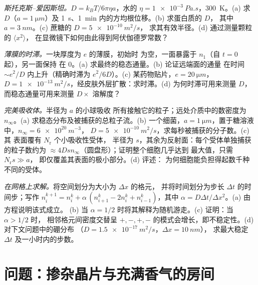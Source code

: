 \begin{exercise}[$\star\star$]\label{exo:b2:particle-diffusion:9}
\emph{斯托克斯–爱因斯坦。}$D = k_BT/6\pi\eta a$，水的 $\eta =
\qty{1e-3}{Pa.s}$，\qty{300}{K}。(a) 求 $D$（$a = \qty{1}{\micro m}$）及
\qty{1}{s}、\qty{1}{min} 内的方均根位移。(b) 求蛋白质的 $D$，
其中 $a = \qty{3}{nm}$。(c) 蔗糖的 $D = \qty{5e-10}{m^2/s}$，
求其有效半径。(d) 通过测量颗粒的 $\langle x^2\rangle$，
在显微镜下如何由此得到阿伏伽德罗常数？
\end{exercise}

\begin{exercise}[$\star\star\star$]\label{exo:b2:particle-diffusion:10}
\emph{薄膜的时滞。}一块厚度为 $e$ 的薄膜，初始时
为空，一面暴露于 $n_1$（自 $t = 0$ 起），另一面保持
在 $0$。(a) 求最终的稳态通量。(b) 论证远端面的通量
在时间 $\sim e^2/D$ 内上升（精确时滞为
$e^2/6D$）。(c) 某药物贴片，$e = \qty{20}{\micro m}$，$D =
\qty{1e-13}{m^2/s}$，经皮肤外层扩散：求时滞。(d) 为何时滞可用来测量 $D$，
而稳态通量可用来测量
$D \times$ 溶解度？
\end{exercise}

\begin{exercise}[$\star\star\star$]\label{exo:b2:particle-diffusion:11}
\emph{完美吸收体。}半径为 $a$ 的小球吸收
所有接触它的粒子；远处介质中的数密度为 $n_\infty$。(a)
求稳态分布及被捕获的总粒子流。(b) 一个细菌，$a =
\qty{1}{\micro m}$，置于糖溶液中，$n_\infty = \qty{6e20}{m^{-3}}$，
$D = \qty{5e-10}{m^2/s}$，求每秒被捕获的分子数。(c) 其
表面覆有 $N_{\text{r}}$ 个小吸收性受体，
半径为 $s$，其余为反射面：每个受体单独捕获的粒子数约为 $\approx
4Ds n_\infty$（圆盘形）；证明整个细胞几乎达到
最大值，只需 $N_{\text{r}} s \gg a$，
即仅覆盖其表面的极小部分。(d) 评述：
为何细胞能负担得起数千种不同的受体。
\end{exercise}

\begin{exercise}[$\star\star\star$]\label{exo:b2:particle-diffusion:12}
\emph{在网格上求解。}将空间划分为大小为 $\Delta x$ 的格元，
并将时间划分为步长 $\Delta t$ 的时间步；写作 $n_i^{k+1} = n_i^k + \alpha\,(n_{i+1}^k
- 2n_i^k + n_{i-1}^k)$，其中 $\alpha = D\Delta t/\Delta x^2$。(a) 由方程说明该式成立。
(b) 当 $\alpha =
1/2$ 时将其解释为随机游走。(c) 证明：当 $\alpha > 1/2$ 时，
相邻格元间密度交替呈 $+,-,+,-$ 的模式会增长，即不稳定性。(d) 对下文问题中的硼分布
（$D = \qty{1.5e-17}{m^2/s}$，$\Delta x = \qty{10}{nm}$），
求最大稳定 $\Delta t$ 及一小时内的步数。
\end{exercise}

\section{问题：掺杂晶片与充满香气的房间}

